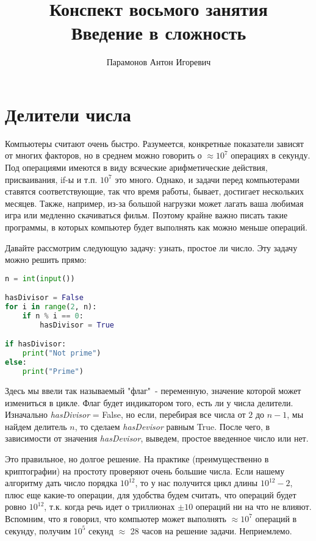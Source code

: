 \documentclass[12pt]{article} %
\begin{document}
\title{Конспект восьмого занятия\\
	\large Введение в сложность}
\author{Парамонов Антон Игоревич}
\maketitle

\section{Делители числа}

Компьютеры считают очень быстро. Разумеется, конкретные показатели зависят от многих факторов, но в среднем можно говорить о $\approx 10^7$ операциях в секунду. Под операциями имеются в виду всяческие арифметические действия, присваивания, if-ы и т.п. $10^7$ это много. Однако, и задачи перед компьютерами ставятся соответствующие, так что время работы, бывает, достигает нескольких месяцев. Также, например, из-за большой нагрузки может лагать ваша любимая игра или медленно скачиваться фильм. Поэтому крайне важно писать такие программы, в которых компьютер будет выполнять как можно меньше операций.

Давайте рассмотрим следующую задачу: узнать, простое ли число. Эту задачу можно решить прямо:
\begin{lstlisting}[language=Python]
n = int(input())

hasDivisor = False
for i in range(2, n):
	if n % i == 0:
		hasDivisor = True

if hasDivisor:
	print("Not prime")
else:
	print("Prime")
\end{lstlisting}

Здесь мы ввели так называемый "флаг"\ - переменную, значение которой может измениться в цикле. Флаг будет индикатором того, есть ли у числа делители. Изначально \textit{hasDivisor} = False, но если, перебирая все числа от $2$ до $n - 1$, мы найдем делитель $n$, то сделаем \textit{hasDevisor} равным True. После чего, в зависимости от значения \textit{hasDevisor}, выведем, простое введенное число или нет.

Это правильное, но долгое решение. На практике (преимущественно в криптографии) на простоту проверяют очень большие числа. Если нашему алгоритму дать число порядка $10^{12}$, то у нас получится цикл длины $10^{12} - 2$, плюс еще какие-то операции, для удобства будем считать, что операций будет ровно $10^{12}$, т.к. когда речь идет о триллионах $\pm 10$ операций ни на что не влияют. Вспомним, что я говорил, что компьютер может выполнять $\approx 10^7$ операций в секунду, получим $10^5$ секунд $\approx$ 28 часов на решение задачи. Неприемлемо.
\end{document}
